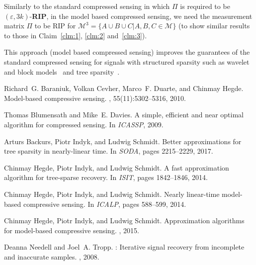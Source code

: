 \documentclass[11pt]{article}
\newcommand{\eps}{\varepsilon}
\begin{document}
Similarly to the standard compressed sensing in which $\Pi$ is required to be $(\eps, 3k)$-{\bf RIP}, in the model based compressed sensing, we need the measurement matrix $\Pi$ to be RIP for $\mathcal{M}^3 = \{ A\cup B\cup C | A, B, C \in \mathcal{M}\}$ (to show similar results to those in Claim~\ref{clm:1}, \ref{clm:2} and~\ref{clm:3}).

This approach (model based compressed sensing) improves the guarantees of the standard compressed sensing for signals with structured sparsity such as wavelet and block models~\cite{BaraniukCDH10} and tree sparsity~\cite{HegdeIS15,HegdeIS14b,HegdeIS14a,BackursIS17}.


\begin{thebibliography}{BCDH10}

Richard~G. Baraniuk, Volkan Cevher, Marco~F. Duarte, and Chinmay Hegde.
\newblock Model-based compressive sensing.
, 55(11):5302--5316,
  2010.

Thomas Blumensath and Mike~E. Davies.
\newblock A simple, efficient and near optimal algorithm for compressed
  sensing.
\newblock In {\em ICASSP}, 2009.

Arturs Backurs, Piotr Indyk, and Ludwig Schmidt.
\newblock Better approximations for tree sparsity in nearly-linear time.
\newblock In {\em SODA}, pages 2215--2229, 2017.

Chinmay Hegde, Piotr Indyk, and Ludwig Schmidt.
\newblock A fast approximation algorithm for tree-sparse recovery.
\newblock In {\em ISIT}, pages 1842--1846, 2014.

Chinmay Hegde, Piotr Indyk, and Ludwig Schmidt.
\newblock Nearly linear-time model-based compressive sensing.
\newblock In {\em ICALP}, pages 588--599, 2014.

Chinmay Hegde, Piotr Indyk, and Ludwig Schmidt.
\newblock Approximation algorithms for model-based compressive sensing.
, 2015.

Deanna Needell and Joel~A. Tropp.
: Iterative signal recovery from incomplete and inaccurate
  samples.
, 2008.

\end{thebibliography}
\end{document}
